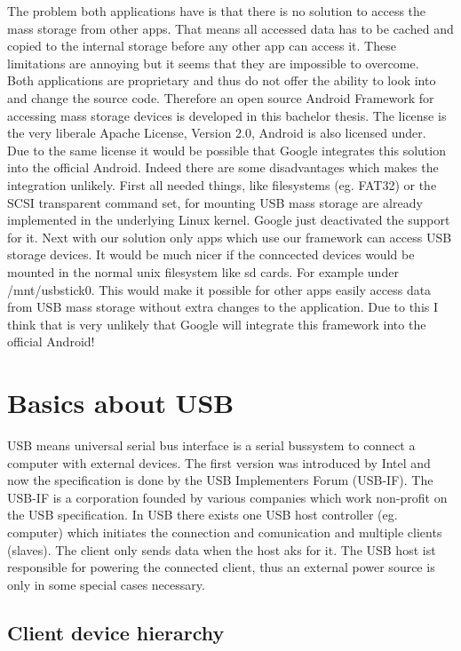 The problem both applications have is that there is no solution to access the mass storage from other apps. That means all accessed data has to be cached and copied to the internal storage before any other app can access it. These limitations are annoying but it seems that they are impossible to overcome.\\
Both applications are proprietary and thus do not offer the ability to look into and change the source code. Therefore an open source Android Framework for accessing mass storage devices is developed in this bachelor thesis. The license is the very liberale Apache License, Version 2.0, Android is also licensed under.\\
Due to the same license it would be possible that Google integrates this solution into the official Android. Indeed there are some disadvantages which makes the integration unlikely. First all needed things, like filesystems (eg. FAT32) or the SCSI transparent command set, for mounting USB mass storage are already implemented in the underlying Linux kernel. Google just deactivated the support for it. Next with our solution only apps which use our framework can access USB storage devices. It would be much nicer if the conncected devices would be mounted in the normal unix filesystem like sd cards. For example under /mnt/usbstick0. This would make it possible for other apps easily access data from USB mass storage without extra changes to the application. Due to this I think that is very unlikely that Google will integrate this framework into the official Android!
 
\section{Basics about USB}

USB means universal serial bus interface is a serial bussystem to connect a computer with external devices. The first version was introduced by Intel and now the specification is done by the USB Implementers Forum (USB-IF). The USB-IF is a corporation founded by various companies which work non-profit on the USB specification. In USB there exists one USB host controller (eg. computer) which initiates the connection and comunication and multiple clients (slaves). The client only sends data when the host aks for it. The USB host ist responsible for powering the connected client, thus an external power source is only in some special cases necessary.

\subsection{Client device hierarchy}

